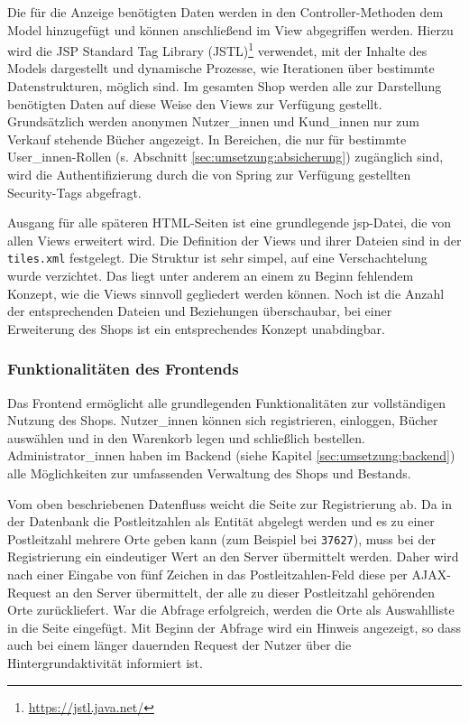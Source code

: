 		Die für die Anzeige benötigten Daten werden in den Controller-Methoden dem Model hinzugefügt und können anschließend im View abgegriffen werden. Hierzu wird die JSP Standard Tag Library (JSTL)\footnote{\hyperlink{https://jstl.java.net/}{https://jstl.java.net/}} verwendet, mit der Inhalte des Models dargestellt und dynamische Prozesse, wie Iterationen über bestimmte Datenstrukturen, möglich sind. Im gesamten Shop werden alle zur Darstellung benötigten Daten auf diese Weise den Views zur Verfügung gestellt. Grundsätzlich werden anonymen Nutzer\_innen und Kund\_innen nur zum Verkauf stehende Bücher angezeigt. In Bereichen, die nur für bestimmte User\_innen-Rollen (s. Abschnitt \ref{sec:umsetzung:absicherung}) zugänglich sind, wird die Authentifizierung durch die von Spring zur Verfügung gestellten Security-Tags abgefragt.
		
		Ausgang für alle späteren HTML-Seiten ist eine grundlegende jsp-Datei, die von allen Views erweitert wird. Die Definition der Views und ihrer Dateien sind in der \lstinline|tiles.xml| festgelegt. Die Struktur ist sehr simpel, auf eine Verschachtelung wurde verzichtet. Das liegt unter anderem an einem zu Beginn fehlendem Konzept, wie die Views sinnvoll gegliedert werden können. Noch ist die Anzahl der entsprechenden Dateien und Beziehungen überschaubar, bei einer Erweiterung des Shops ist ein entsprechendes Konzept unabdingbar.
		
		\subsubsection{Funktionalitäten des Frontends}
		Das Frontend ermöglicht alle grundlegenden Funktionalitäten zur vollständigen Nutzung des Shops. Nutzer\_innen können sich registrieren, einloggen, Bücher auswählen und in den Warenkorb legen und schließlich bestellen. Administrator\_innen haben im Backend (siehe Kapitel \ref{sec:umsetzung:backend}) alle Möglichkeiten zur umfassenden Verwaltung des Shops und Bestands.
		
		Vom oben beschriebenen Datenfluss weicht die Seite zur Registrierung ab. Da in der Datenbank die Postleitzahlen als Entität abgelegt werden und es zu einer Postleitzahl mehrere Orte geben kann (zum Beispiel bei \lstinline|37627|), muss bei der Registrierung ein eindeutiger Wert an den Server übermittelt werden. Daher wird nach einer Eingabe von fünf Zeichen in das Postleitzahlen-Feld diese per AJAX-Request an den Server übermittelt, der alle zu dieser Postleitzahl gehörenden Orte zurückliefert. War die Abfrage erfolgreich, werden die Orte als Auswahlliste in die Seite eingefügt. Mit Beginn der Abfrage wird ein Hinweis angezeigt, so dass auch bei einem länger dauernden Request der Nutzer über die Hintergrundaktivität informiert ist.
		
